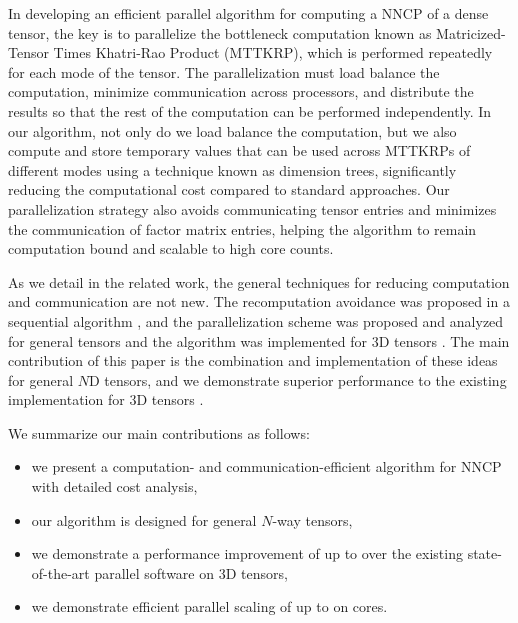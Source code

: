 In developing an efficient parallel algorithm for computing a NNCP of a dense tensor, the key is to parallelize the bottleneck computation known as Matricized-Tensor Times Khatri-Rao Product (MTTKRP), which is performed repeatedly for each mode of the tensor.
The parallelization must load balance the computation, minimize communication across processors, and distribute the results so that the rest of the computation can be performed independently.
In our algorithm, not only do we load balance the computation, but we also compute and store temporary values that can be used across MTTKRPs of different modes using a technique known as dimension trees, significantly reducing the computational cost compared to standard approaches.
Our parallelization strategy also avoids communicating tensor entries and minimizes the communication of factor matrix entries, helping the algorithm to remain computation bound and scalable to high core counts.

As we detail in the related work, the general techniques for reducing computation and communication are not new.
The recomputation avoidance was proposed in a sequential algorithm \cite{PTC13a}, and the parallelization scheme was proposed and analyzed for general tensors \cite{BKR17-TR} and the algorithm was implemented for 3D tensors \cite{LK+17b}.
The main contribution of this paper is the combination and implementation of these ideas for general $N$D tensors, and we demonstrate superior performance to the existing implementation for 3D tensors \cite{LK+17b}.

We summarize our main contributions as follows:
\begin{itemize}
		\item we present a computation- and communication-efficient algorithm for NNCP with detailed cost analysis,
		\item our algorithm is designed for general $N$-way tensors,
		\item we demonstrate a performance improvement of up to \grey{$2.2\times$} over the existing state-of-the-art parallel software on 3D tensors,
		\item we demonstrate efficient parallel scaling of up to \grey{$253\times$} on  cores.
\end{itemize}